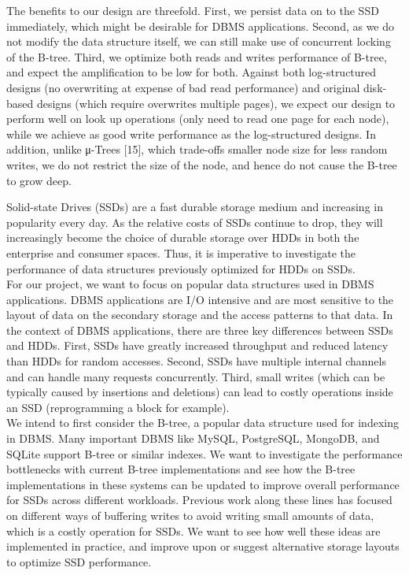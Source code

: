 The benefits to our design are threefold.
First, we persist data on to the SSD immediately, which might be desirable for DBMS applications.
Second, as we do not modify the data structure itself, we can still make use of concurrent locking of the B-tree.
Third, we optimize both reads and writes performance of B-tree, and expect the amplification to
be low for both.
Against both log-structured designs (no overwriting at expense of bad read performance) and original disk-based designs (which require overwrites multiple pages), we expect our design to perform well on look up operations (only need to read one page for each node), while we achieve as good write performance as the log-structured designs.
In addition, unlike μ-Trees [15], which trade-offs smaller node size for less random writes, we do not restrict the size of the node, and hence do not cause the B-tree to grow deep.\\
\fi


Solid-state Drives (SSDs) are a fast durable storage medium and increasing in popularity every day.
As the relative costs of SSDs continue to drop, they will increasingly become the choice of durable storage over HDDs in both the enterprise and consumer spaces.
Thus, it is imperative to investigate the performance of data structures previously optimized for HDDs on SSDs.\\

For our project, we want to focus on popular data structures used in DBMS applications.
DBMS applications are I/O intensive and are most sensitive to the layout of data on the secondary storage and the access patterns to that data.
In the context of DBMS applications, there are three key differences between SSDs and HDDs.
First, SSDs have greatly increased throughput and reduced latency than HDDs for random accesses.
Second, SSDs have multiple internal channels and can handle many requests concurrently.
Third, small writes (which can be typically caused by insertions and deletions) can lead to costly operations inside an SSD (reprogramming a block for example).\\

We intend to first consider the B-tree, a popular data structure used for indexing in DBMS.
Many important DBMS like MySQL, PostgreSQL, MongoDB, and SQLite support B-tree or similar indexes.
We want to investigate the performance bottlenecks with current B-tree implementations and see how the B-tree implementations in these systems can be updated to improve overall performance for SSDs across different workloads.
Previous work along these lines has focused on different ways of buffering writes to avoid writing small amounts of data, which is a costly operation for SSDs.
We want to see how well these ideas are implemented in practice, and improve upon or suggest alternative storage layouts to optimize SSD performance.\\

